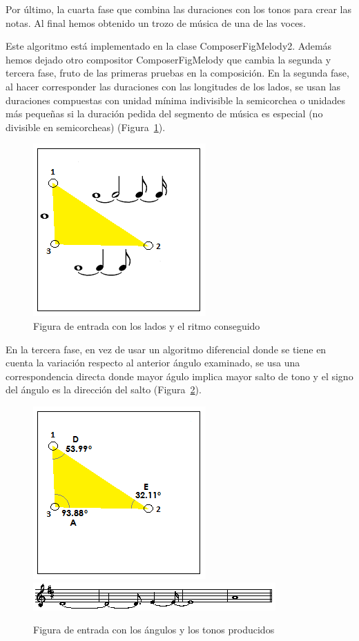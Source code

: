 Por último, la cuarta fase que combina las duraciones con los tonos para crear las notas. Al final hemos obtenido un trozo de música de una de las voces.

Este algoritmo está implementado en la clase ComposerFigMelody2. Además hemos dejado otro compositor ComposerFigMelody que cambia la segunda y tercera fase, fruto de las primeras pruebas en la composición. En la segunda fase, al hacer corresponder las duraciones con las longitudes de los lados, se usan las duraciones compuestas con unidad mínima indivisible la semicorchea o unidades más pequeñas si la duración pedida del segmento de música es especial (no divisible en semicorcheas) (Figura~\ref{fig:Figura5Voz1}).

		\begin{figure}[htbp]
		\centering
		\hspace*{0.0in}
		\includegraphics[scale=1]{graphics/simpletest1-F2_2.png}
		\caption{Figura de entrada con los lados y el ritmo conseguido}
		\label{fig:Figura5Voz1}
		\end{figure}

En la tercera fase, en vez de usar un algoritmo diferencial donde se tiene en cuenta la variación respecto al anterior ángulo examinado, se usa una correspondencia directa donde mayor águlo implica mayor salto de tono y el signo del ángulo es la dirección del salto (Figura~\ref{fig:Figura6Voz1}).

		\begin{figure}[htbp]
		\centering
		\hspace*{0.0in}
		\includegraphics[scale=1]{graphics/simpletest1-F3_2.png}
		\includegraphics[scale=1]{graphics/simpletest1_2-MELpartitura.png}
		\caption{Figura de entrada con los ángulos y los tonos producidos}
		\label{fig:Figura6Voz1}
		\end{figure}

